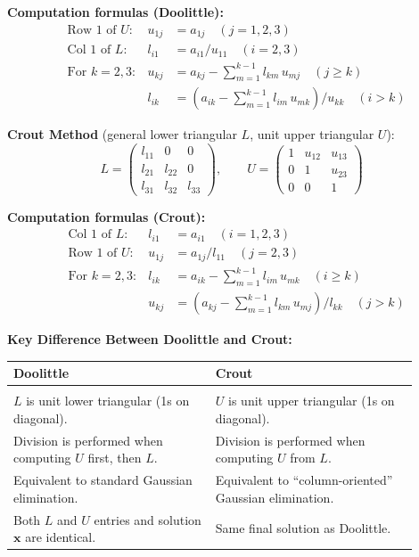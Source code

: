 \documentclass[12pt]{article}
\begin{document}
\textbf{Computation formulas (Doolittle):}
\begin{align*}
  &\text{Row 1 of }U{:} & u_{1j} &= a_{1j} \quad (j=1,2,3) \\
  &\text{Col 1 of }L{:} & l_{i1} &= a_{i1}/u_{11} \quad (i=2,3) \\
  &\text{For }k=2,3{:} & u_{kj} &= a_{kj} - \sum_{m=1}^{k-1} l_{km}\,u_{mj} \quad (j \geq k) \\
  & & l_{ik} &= \left(a_{ik} - \sum_{m=1}^{k-1} l_{im}\,u_{mk}\right)/u_{kk} \quad (i > k)
\end{align*}

\vspace{8pt}
\noindent\textbf{Crout Method} (general lower triangular $L$, unit upper triangular $U$):
\[
  L = \begin{pmatrix} l_{11} & 0 & 0 \\ l_{21} & l_{22} & 0 \\ l_{31} & l_{32} & l_{33} \end{pmatrix}, \qquad
  U = \begin{pmatrix} 1 & u_{12} & u_{13} \\ 0 & 1 & u_{23} \\ 0 & 0 & 1 \end{pmatrix}
\]

\textbf{Computation formulas (Crout):}
\begin{align*}
  &\text{Col 1 of }L{:} & l_{i1} &= a_{i1} \quad (i=1,2,3) \\
  &\text{Row 1 of }U{:} & u_{1j} &= a_{1j}/l_{11} \quad (j=2,3) \\
  &\text{For }k=2,3{:} & l_{ik} &= a_{ik} - \sum_{m=1}^{k-1} l_{im}\,u_{mk} \quad (i \geq k) \\
  & & u_{kj} &= \left(a_{kj} - \sum_{m=1}^{k-1} l_{km}\,u_{mj}\right)/l_{kk} \quad (j > k)
\end{align*}

\begin{observebox}
\textbf{Key Difference Between Doolittle and Crout:}\\[4pt]
\begin{tabular}{p{0.45\linewidth} p{0.45\linewidth}}
\textbf{Doolittle} & \textbf{Crout} \\[2pt]
\hline\\[-6pt]
$L$ is unit lower triangular (1s on diagonal). & $U$ is unit upper triangular (1s on diagonal). \\
Division is performed when computing $U$ first, then $L$. & Division is performed when computing $U$ from $L$. \\
Equivalent to standard Gaussian elimination. & Equivalent to ``column-oriented'' Gaussian elimination. \\
Both $L$ and $U$ entries and solution $\mathbf{x}$ are identical. & Same final solution as Doolittle. \\
\end{tabular}
\end{observebox}
\end{document}
